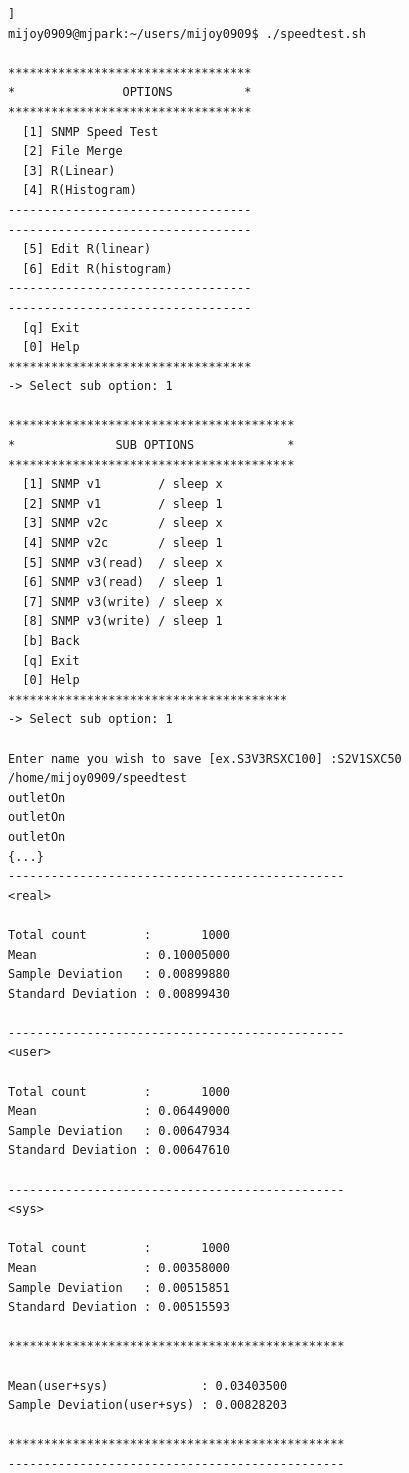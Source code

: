 \documentclass[11pt
  , a4paper
  , article
  , oneside
]{memoir}
\begin{document}
\begin{lstlisting}[style=termstyle, caption=SNMP 응답시간 테스트 Script CLI, label={list:lst1}]]
mijoy0909@mjpark:~/users/mijoy0909$ ./speedtest.sh

**********************************
*               OPTIONS          *
**********************************
  [1] SNMP Speed Test             
  [2] File Merge                  
  [3] R(Linear)                   
  [4] R(Histogram)                
----------------------------------
----------------------------------
  [5] Edit R(linear)              
  [6] Edit R(histogram)           
----------------------------------
----------------------------------
  [q] Exit                        
  [0] Help                        
**********************************
-> Select sub option: 1

****************************************
*              SUB OPTIONS             *
****************************************
  [1] SNMP v1        / sleep x          
  [2] SNMP v1        / sleep 1          
  [3] SNMP v2c       / sleep x          
  [4] SNMP v2c       / sleep 1          
  [5] SNMP v3(read)  / sleep x          
  [6] SNMP v3(read)  / sleep 1          
  [7] SNMP v3(write) / sleep x          
  [8] SNMP v3(write) / sleep 1          
  [b] Back                              
  [q] Exit                              
  [0] Help                              
***************************************
-> Select sub option: 1

Enter name you wish to save [ex.S3V3RSXC100] :S2V1SXC50
/home/mijoy0909/speedtest
outletOn
outletOn
outletOn
{...}
-----------------------------------------------
<real>

Total count        :       1000
Mean               : 0.10005000
Sample Deviation   : 0.00899880
Standard Deviation : 0.00899430

-----------------------------------------------
<user>

Total count        :       1000
Mean               : 0.06449000
Sample Deviation   : 0.00647934
Standard Deviation : 0.00647610

-----------------------------------------------
<sys>

Total count        :       1000
Mean               : 0.00358000
Sample Deviation   : 0.00515851
Standard Deviation : 0.00515593

***********************************************

Mean(user+sys)             : 0.03403500
Sample Deviation(user+sys) : 0.00828203

***********************************************
-----------------------------------------------
\end{lstlisting}
\end{document}
